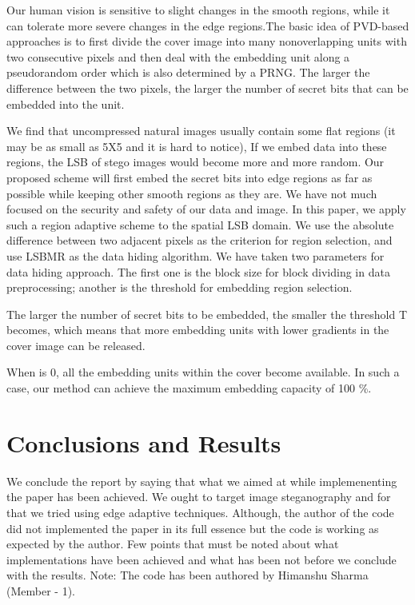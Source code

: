 \documentclass{report}
\begin{document}
\par
Our human vision is sensitive to slight changes in the smooth
regions, while it can tolerate more severe changes in the edge
regions.The
basic idea of PVD-based approaches is to first divide the cover
image into many nonoverlapping units with two consecutive
pixels and then deal with the embedding unit along a pseudorandom
order which is also determined by a PRNG.
The larger the difference between the two pixels, the larger the number of
secret bits that can be embedded into the unit.

\par We find that uncompressed natural images usually
contain some flat regions (it may be as small as 5X5 and it
is hard to notice), If we embed data into these regions, the LSB of stego images would become more and more random.
Our proposed
scheme will first embed the secret bits into edge regions as far
as possible while keeping other smooth regions as they are.
We have not much focused on the security and safety of our data and image.
In this paper, we apply such a region adaptive scheme to the
spatial LSB domain. We use the absolute difference between
two adjacent pixels as the criterion for region selection, and use
LSBMR as the data hiding algorithm. We have taken two parameters for data hiding approach. The first one is the block size for block dividing in data preprocessing;
another is the threshold for embedding region selection.
\par 
The larger the
number of secret bits to be embedded, the smaller the threshold T
becomes, which means that more embedding units with
lower gradients in the cover image can be released.

When is 0, all the embedding units within the cover become
available. In such a case, our method can achieve the maximum
embedding capacity of 100 \%.

\section{Conclusions and Results}
We conclude the report by saying that what we aimed at while implemenenting the paper has been achieved. We ought to target image steganography and for that we tried using edge adaptive techniques. Although, the author of the code did not implemented the paper in its full essence but the code is working as expected by the author. Few points that must be noted about what implementations have been achieved and what has been not before we conclude with the results. Note: The code has been authored by Himanshu Sharma (Member - 1). \newpage
\end{document}
